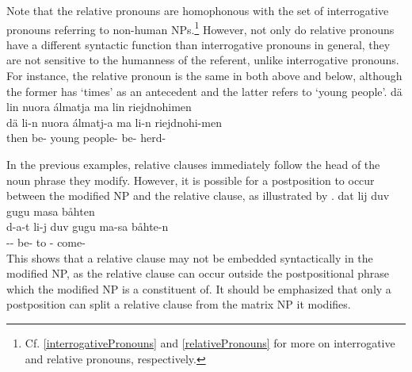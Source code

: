 Note that the relative pronouns are homophonous with the %
set of interrogative pronouns referring to non-human NPs.\footnote{Cf. \SEC\ref{interrogativePronouns} and \SEC\ref{relativePronouns} for more on interrogative and relative pronouns, respectively.} 
However, not only do relative pronouns have a different syntactic function than interrogative pronouns in general, they are not sensitive to the humanness of the referent, unlike interrogative pronouns. For instance, the relative pronoun  is the same in both  above and  below, although the former has ‘times’ as an antecedent and the latter refers to ‘young people’.
\ea\label{relClause5}%
\glll	dä lin nuora álmatja ma lin riejdnohimen\\
	dä li-n nuora álmatj-a ma li-n riejdnohi-men\\
	then be- young\BS{} people- \BS{} be- herd-\\\nopagebreak
{} 
\z

In the previous examples, relative clauses immediately follow the head of the noun phrase they modify. However, it is possible for a postposition to occur between the modified NP and the relative clause, as illustrated by . 
\ea\label{relClause6}%
\glll	dat lij duv gugu masa båhten\\
	d-a-t li-j duv gugu ma-sa båhte-n\\
	-- be-  to - come-\\\nopagebreak
{} 
\z
This shows that a relative clause may not be embedded syntactically in the modified NP, as the relative clause can occur outside the postpositional phrase which the modified NP is a constituent of. It should be emphasized that only a postposition can split a relative clause from the matrix NP it modifies.

